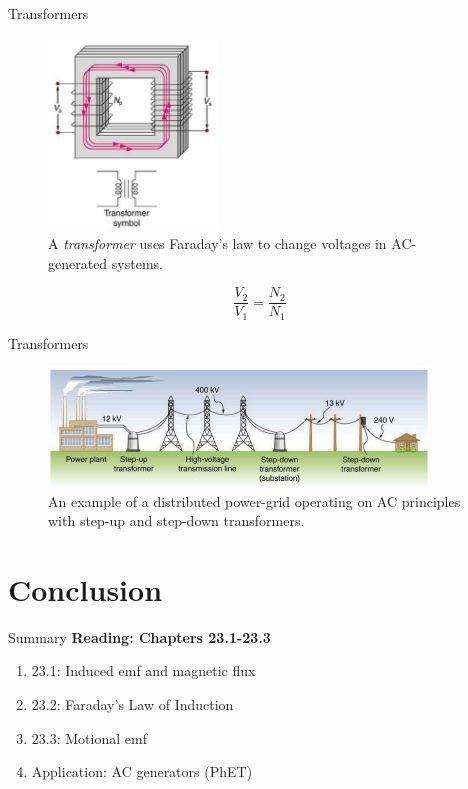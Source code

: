 \documentclass{beamer}
\begin{document}
\begin{frame}{Transformers}
\small
\begin{figure}
\centering
\includegraphics[width=0.4\textwidth]{figures/trans.png}
\caption{\label{fig:trans1} A \textit{transformer} uses Faraday's law to change voltages in AC-generated systems.}
\end{figure}
\begin{equation}
\frac{V_2}{V_1} = \frac{N_2}{N_1}
\end{equation}
\end{frame}

\begin{frame}{Transformers}
\small
\begin{figure}
\centering
\includegraphics[width=0.9\textwidth]{figures/trans2.png}
\caption{\label{fig:trans2} An example of a distributed power-grid operating on AC principles with step-up and step-down transformers.}
\end{figure}
\end{frame}

\section{Conclusion}

\begin{frame}{Summary}
\textbf{Reading: Chapters 23.1-23.3} \\ \vspace{0.5cm}
\begin{enumerate}
\item 23.1: Induced emf and magnetic flux
\item 23.2: Faraday's Law of Induction
\item 23.3: Motional emf
\item Application: AC generators (PhET)
\end{enumerate}
\end{frame}
\end{document}
